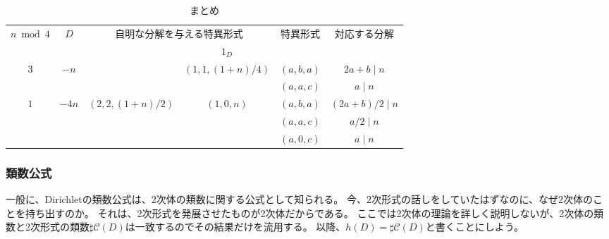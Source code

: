 \begin{table}[htb]
\caption{まとめ}
\centering
\begin{tabular}{|c|c|c|c|c|c|}\hline
\multirow{2}{*}{$n \bmod{4}$} & \multirow{2}{*}{$D$}   & \multicolumn{2}{c|}{自明な分解を与える特異形式}                     & \multirow{2}{*}{特異形式} & \multirow{2}{*}{対応する分解} \\ \cline{4-4}
                              &                        &                                  & $1_D$                            &                           &                               \\ \hline\hline
\multirow{2}{*}{$3$}          & \multirow{2}{*}{$-n$}  &                                  & \multirow{2}{*}{$(1,1,(1+n)/4)$} & $(a,b,a)$                 & $2a + b \mid n$               \\ \cline{5-6}
                              &                        &                                  &                                  & $(a,a,c)$                 & $a \mid n$                    \\ \hline
\multirow{3}{*}{$1$}          & \multirow{3}{*}{$-4n$} & \multirow{3}{*}{$(2,2,(1+n)/2)$} & \multirow{3}{*}{$(1,0,n)$}       & $(a,b,a)$                 & $(2a + b)/2 \mid n$           \\ \cline{5-6}
                              &                        &                                  &                                  & $(a,a,c)$                 & $a/2 \mid n$                  \\ \cline{5-6}
                              &                        &                                  &                                  & $(a,0,c)$                 & $a \mid n$                    \\ \hline
\end{tabular}
\end{table}

\subsubsection{類数公式}
一般に、Dirichletの類数公式は、2次体の類数に関する公式として知られる。
今、2次形式の話しをしていたはずなのに、なぜ2次体のことを持ち出すのか。
それは、2次形式を発展させたものが2次体だからである。
ここでは2次体の理論を詳しく説明しないが、2次体の類数と2次形式の類数$\sharp\mathcal{C}(D)$は一致するのでその結果だけを流用する。
以降、$h(D)=\sharp\mathcal{C}(D)$と書くことにしよう。

